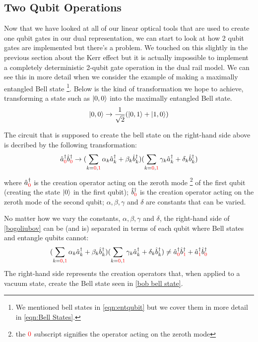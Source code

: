 



\subsection{Two Qubit Operations}
Now that we have looked at all of our linear optical tools that are used to create one qubit gates in our dual representation, we can start to look at how 2 qubit gates are implemented but there's a problem. We touched on this slightly in the previous section about the Kerr effect but it is actually impossible to implement a completely deterministic 2-qubit gate operation in the dual rail model. We can see this in more detail when we consider the example of making a maximally entangled Bell state \footnote{We mentioned bell states in  \cref{eqn:entqubit} but we cover them in more detail in \ref{eqn:Bell States}.}. Below is the kind of transformation we hope to achieve, transforming a state such as $\ket{0,0}$ into the maximally entangled Bell state.
\begin{equation} \label{bob bell state}
    \ket{0,0} \rightarrow \frac{1}{\sqrt{2}}(\ket{0,1} + \ket{1,0})
\end{equation}

The circuit that is supposed to create the bell state on the right-hand side above is decribed by the following transformation:
\begin{equation} \label{bogoliubov}
    \hat{a}^{\dag}_{\color{red}0}\hat{b}^{\dag}_{\color{red}0} \rightarrow (\sum\limits_{k={\color{red}0},{\color{red}1}}\alpha_k\hat{a}^{\dag}_k + \beta_k\hat{b}^{\dag}_k)(\sum\limits_{k={\color{red}0},{\color{red}1}}\gamma_k\hat{a}^{\dag}_k + \delta_k\hat{b}^{\dag}_k)
\end{equation}
where $\hat{a}^\dag_{\color{red}0}$ is the creation operator acting on the zeroth mode \footnote{the ${\color{red}0}$ subscript signifies the operator acting on the zeroth mode} of the first qubit (creating the state $\ket{0}$ in the first qubit); $\hat{b}^\dag_{\color{red}0}$ is the creation operator acting on the zeroth mode of the second qubit; $\alpha, \beta, \gamma$ and $\delta$ are constants that can be varied.
\par
No matter how we vary the constants,  $\alpha, \beta, \gamma$ and $\delta$, the right-hand side of \cref{bogoliubov} can be (and is) separated in terms of each qubit where Bell states and entangle qubits cannot:
\begin{equation}
    (\sum\limits_{k={\color{red}0},{\color{red}1}}\alpha_k\hat{a}^{\dag}_k + \beta_k\hat{b}^{\dag}_k)(\sum\limits_{k={\color{red}0},{\color{red}1}}\gamma_k\hat{a}^{\dag}_k + \delta_k\hat{b}^{\dag}_k) \neq \hat{a}^{\dag}_{\color{red}0}\hat{b}^{\dag}_{\color{red}1} + \hat{a}^{\dag}_{\color{red}1}\hat{b}^{\dag}_{\color{red}0}
\end{equation}
The right-hand side represents the creation operators that, when applied to a vacuum state, create the Bell state seen in \cref{bob bell state}.

